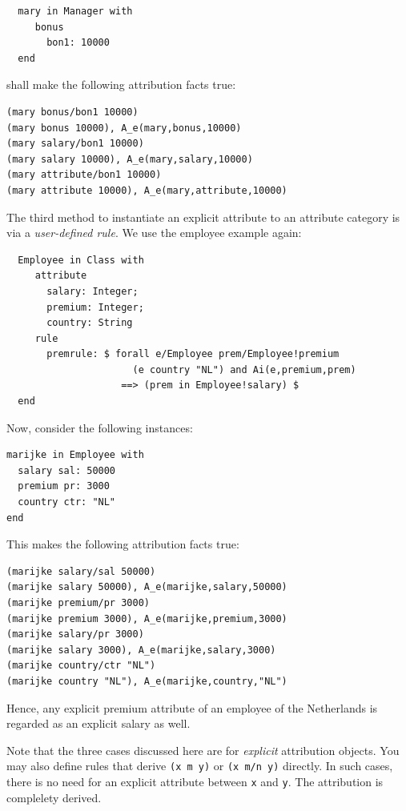\begin{verbatim}
  mary in Manager with
     bonus
       bon1: 10000
  end
\end{verbatim}

shall make the following attribution facts true:

\begin{verbatim}
(mary bonus/bon1 10000)
(mary bonus 10000), A_e(mary,bonus,10000)
(mary salary/bon1 10000)
(mary salary 10000), A_e(mary,salary,10000)
(mary attribute/bon1 10000)
(mary attribute 10000), A_e(mary,attribute,10000)
\end{verbatim}

The third method to instantiate an explicit attribute to an attribute category is via 
a {\em user-defined rule}.
We use the employee example again:

\begin{verbatim}
  Employee in Class with
     attribute
       salary: Integer;
       premium: Integer;
       country: String
     rule
       premrule: $ forall e/Employee prem/Employee!premium 
                      (e country "NL") and Ai(e,premium,prem)
                    ==> (prem in Employee!salary) $
  end  
\end{verbatim}

Now, consider the following instances:

\begin{verbatim}
marijke in Employee with
  salary sal: 50000
  premium pr: 3000
  country ctr: "NL"
end
\end{verbatim}

This makes the following attribution facts true:

\begin{verbatim}
(marijke salary/sal 50000)
(marijke salary 50000), A_e(marijke,salary,50000)
(marijke premium/pr 3000)
(marijke premium 3000), A_e(marijke,premium,3000)
(marijke salary/pr 3000)
(marijke salary 3000), A_e(marijke,salary,3000)
(marijke country/ctr "NL")
(marijke country "NL"), A_e(marijke,country,"NL")
\end{verbatim}

Hence, any explicit premium attribute of an employee of the Netherlands is regarded as an
explicit salary as well.

Note that the three cases discussed here are for {\em explicit\/} attribution objects. You may also
define rules that derive {\tt (x m y)} or {\tt (x m/n y)} directly. In such cases, there is no need
for an explicit attribute between {\tt x}  and {\tt y}. The attribution is complelety derived.


